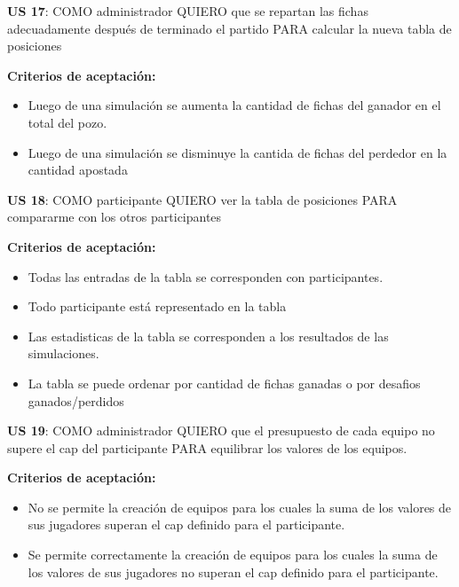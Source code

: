 \begin{tcolorbox}
\textbf{US 17}: COMO administrador QUIERO que se repartan las fichas adecuadamente después de terminado el partido PARA calcular la nueva tabla de posiciones

\vline

\textbf{Criterios de aceptación:}
\begin{itemize}
\item Luego de una simulación se aumenta la cantidad de fichas del ganador en el total del pozo.
\item Luego de una simulación se disminuye la cantida de fichas del perdedor en la cantidad apostada
\end{itemize}
\end{tcolorbox}
\vspace{10pt}

\begin{tcolorbox}
\textbf{US 18}: COMO participante QUIERO ver la tabla de posiciones PARA compararme con los otros participantes

\vline

\textbf{Criterios de aceptación:}
\begin{itemize}
\item Todas las entradas de la tabla se corresponden con participantes.
\item Todo participante está representado en la tabla
\item Las estadisticas de la tabla se corresponden a los resultados de las simulaciones.
\item La tabla se puede ordenar por cantidad de fichas ganadas o por desafios ganados/perdidos
\end{itemize}
\end{tcolorbox}
\vspace{10pt}

\begin{tcolorbox}
\textbf{US 19}: COMO administrador QUIERO que el presupuesto de cada equipo no supere el cap del participante PARA equilibrar los valores de los equipos.

\vline

\textbf{Criterios de aceptación:}
\begin{itemize}
\item No se permite la creación de equipos para los cuales la suma de los valores de sus jugadores superan el cap definido para el participante.
\item Se permite correctamente la creación de equipos para los cuales la suma de los valores de sus jugadores no superan el cap definido para el participante.
\end{itemize}
\end{tcolorbox}
\vspace{10pt}

